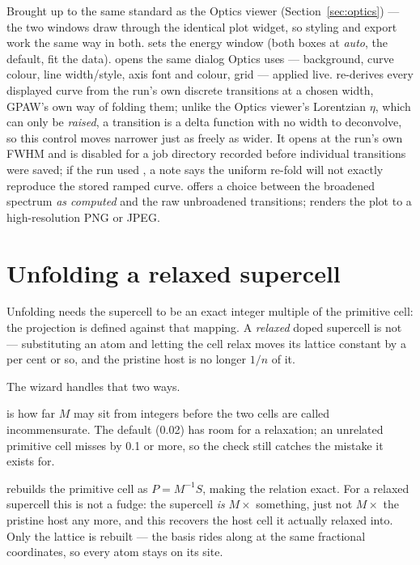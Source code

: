 Brought up to the same standard as the Optics viewer (Section~\ref{sec:optics}) ---
the two windows draw through the identical plot widget, so styling and export
work the same way in both.  sets the energy window (both boxes at
\emph{auto}, the default, fit the data).  opens
the same dialog Optics uses --- background, curve colour, line width/style,
axis font and colour, grid --- applied live. 
re-derives every displayed curve from the run's own discrete transitions at a
chosen width, GPAW's own way of folding them; unlike the Optics viewer's
Lorentzian $\eta$, which can only be \emph{raised}, a transition is a delta
function with no width to deconvolve, so this control moves narrower just as
freely as wider. It opens at the run's own FWHM and is disabled for a job
directory recorded before individual transitions were saved; if the run used
, a note says the uniform re-fold will not
exactly reproduce the stored ramped curve.  offers a
choice between the broadened spectrum \emph{as computed} and the raw
unbroadened transitions;  renders the plot to a
high-resolution PNG or JPEG.

\section{Unfolding a relaxed supercell}
\label{sec:unfoldrelaxed}

Unfolding needs the supercell to be an exact integer multiple of the primitive
cell: the projection is defined against that mapping. A \emph{relaxed} doped
supercell is not --- substituting an atom and letting the cell relax moves its
lattice constant by a per cent or so, and the pristine host is no longer
$1/n$ of it.

The  wizard handles that two ways.

 is how far $M$ may sit from integers before the two cells are
called incommensurate. The default (0.02) has room for a relaxation; an
unrelated primitive cell misses by 0.1 or more, so the check still catches the
mistake it exists for.

 rebuilds the primitive
cell as $P = M^{-1} S$, making the relation exact. For a relaxed supercell this
is not a fudge: the supercell \emph{is} $M \times$ something, just not
$M \times$ the pristine host any more, and this recovers the host cell it
actually relaxed into. Only the lattice is rebuilt --- the basis rides along at
the same fractional coordinates, so every atom stays on its site.

